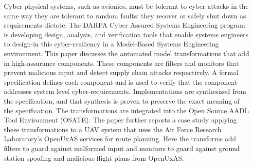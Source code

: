 Cyber-physical systems, such as avionics, must be tolerant to cyber-attacks in the same way they are tolerant to random faults: they recover or safely shut down as requirements dictate. The DARPA Cyber Assured Systems Engineering program is developing design, analysis, and verification tools that enable systems engineers to design-in this cyber-resiliency in a Model-Based Systems Engineering environment. This paper discusses the automated model transformations that add in high-assurance components. These components are filters and monitors that prevent malicious input and detect supply chain attacks respectively. A formal specification defines each component and is used to verify that the component addresses system level cyber-requirements. Implementations are synthesized from the specification, and that synthesis is proven to preserve the exact meaning of the specification. The transformations are integrated into the Open Source AADL Tool Environment (OSATE). The paper further reports a case study applying these transformations to a UAV system that uses the Air Force Research Laboratory's OpenUxAS services for route planning. Here the transforms add filters to guard against malformed input and monitors to guard against ground station spoofing and malicious flight plans from OpenUxAS.
